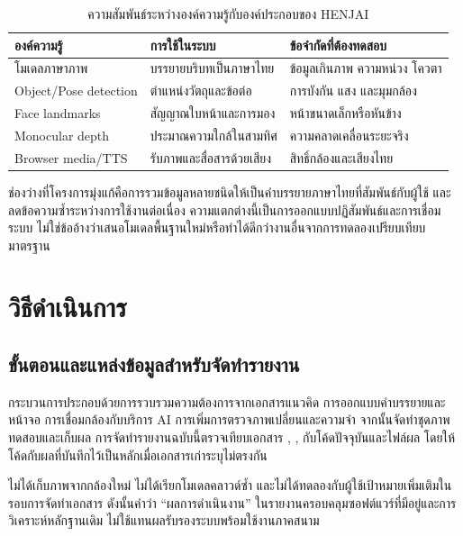 \begin{table}[H]\centering\caption{ความสัมพันธ์ระหว่างองค์ความรู้กับองค์ประกอบของ HENJAI}
\begin{tabularx}{\linewidth}{p{32mm}YY}\toprule องค์ความรู้ & การใช้ในระบบ & ข้อจำกัดที่ต้องทดสอบ\\\midrule
โมเดลภาษาภาพ & บรรยายบริบทเป็นภาษาไทย & ข้อมูลเกินภาพ ความหน่วง โควตา\\
Object/Pose detection & ตำแหน่งวัตถุและข้อต่อ & การบังกัน แสง และมุมกล้อง\\
Face landmarks & สัญญาณใบหน้าและการมอง & หน้าขนาดเล็กหรือหันข้าง\\
Monocular depth & ประมาณความใกล้ในสามทิศ & ความคลาดเคลื่อนระยะจริง\\
Browser media/TTS & รับภาพและสื่อสารด้วยเสียง & สิทธิ์กล้องและเสียงไทย\\\bottomrule
\end{tabularx}\end{table}

ช่องว่างที่โครงการมุ่งแก้คือการรวมข้อมูลหลายชนิดให้เป็นคำบรรยายภาษาไทยที่สัมพันธ์กับผู้ใช้ และลดข้อความซ้ำระหว่างการใช้งานต่อเนื่อง ความแตกต่างนี้เป็นการออกแบบปฏิสัมพันธ์และการเชื่อมระบบ ไม่ใช่ข้ออ้างว่าเสนอโมเดลพื้นฐานใหม่หรือทำได้ดีกว่างานอื่นจากการทดลองเปรียบเทียบมาตรฐาน

\chapter{วิธีดำเนินการ}
\section{ขั้นตอนและแหล่งข้อมูลสำหรับจัดทำรายงาน}
กระบวนการประกอบด้วยการรวบรวมความต้องการจากเอกสารแนวคิด การออกแบบคำบรรยายและหน้าจอ การเชื่อมกล้องกับบริการ AI การเพิ่มการตรวจภาพเปลี่ยนและความจำ จากนั้นจัดทำชุดภาพทดสอบและเก็บผล การจัดทำรายงานฉบับนี้ตรวจเทียบเอกสาร , ,  กับโค้ดปัจจุบันและไฟล์ผล โดยให้โค้ดกับผลที่บันทึกไว้เป็นหลักเมื่อเอกสารเก่าระบุไม่ตรงกัน

ไม่ได้เก็บภาพจากกล้องใหม่ ไม่ได้เรียกโมเดลคลาวด์ซ้ำ และไม่ได้ทดลองกับผู้ใช้เป้าหมายเพิ่มเติมในรอบการจัดทำเอกสาร ดังนั้นคำว่า ``ผลการดำเนินงาน'' ในรายงานครอบคลุมซอฟต์แวร์ที่มีอยู่และการวิเคราะห์หลักฐานเดิม ไม่ใช้แทนผลรับรองระบบพร้อมใช้งานภาคสนาม

